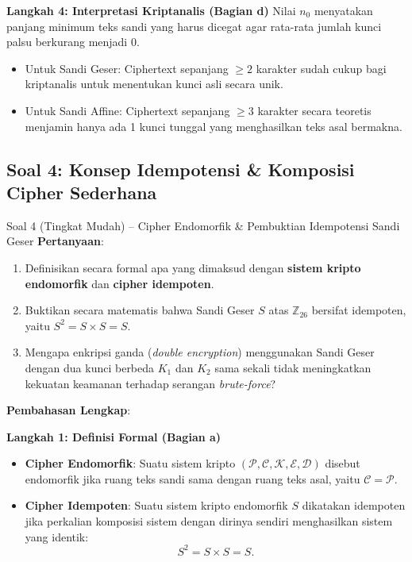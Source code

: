 \documentclass[11pt,a4paper]{article}
\begin{document}
\noindent\textbf{Langkah 4: Interpretasi Kriptanalis (Bagian d)}
Nilai $n_0$ menyatakan panjang minimum teks sandi yang harus dicegat agar rata-rata jumlah kunci palsu berkurang menjadi 0.
\begin{itemize}
    \item Untuk Sandi Geser: Ciphertext sepanjang $\ge 2$ karakter sudah cukup bagi kriptanalis untuk menentukan kunci asli secara unik.
    \item Untuk Sandi Affine: Ciphertext sepanjang $\ge 3$ karakter secara teoretis menjamin hanya ada 1 kunci tunggal yang menghasilkan teks asal bermakna.
\end{itemize}

\vspace{0.4cm}

\subsection{Soal 4: Konsep Idempotensi \& Komposisi Cipher Sederhana}

\begin{soalmudah}{Soal 4 (Tingkat Mudah) -- Cipher Endomorfik \& Pembuktian Idempotensi Sandi Geser}
\textbf{Pertanyaan}:
\begin{enumerate}[label=\alph*)]
    \item Definisikan secara formal apa yang dimaksud dengan \textbf{sistem kripto endomorfik} dan \textbf{cipher idempoten}.
    \item Buktikan secara matematis bahwa Sandi Geser $S$ atas $\mathbb{Z}_{26}$ bersifat idempoten, yaitu $S^2 = S \times S = S$.
    \item Mengapa enkripsi ganda (\textit{double encryption}) menggunakan Sandi Geser dengan dua kunci berbeda $K_1$ dan $K_2$ sama sekali tidak meningkatkan kekuatan keamanan terhadap serangan \textit{brute-force}?
\end{enumerate}
\end{soalmudah}

\noindent\textbf{Pembahasan Lengkap}:

\noindent\textbf{Langkah 1: Definisi Formal (Bagian a)}
\begin{itemize}
    \item \textbf{Cipher Endomorfik}: Suatu sistem kripto $(\mathcal{P}, \mathcal{C}, \mathcal{K}, \mathcal{E}, \mathcal{D})$ disebut endomorfik jika ruang teks sandi sama dengan ruang teks asal, yaitu $\mathcal{C} = \mathcal{P}$.
    \item \textbf{Cipher Idempoten}: Suatu sistem kripto endomorfik $S$ dikatakan idempoten jika perkalian komposisi sistem dengan dirinya sendiri menghasilkan sistem yang identik:
    \begin{equation}
    S^2 = S \times S = S.
    \end{equation}
\end{itemize}
\end{document}
